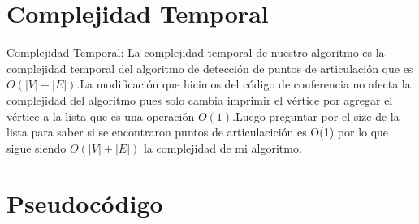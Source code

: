 \documentclass{article}
\begin{document}
    \section{Complejidad Temporal} 
    Complejidad Temporal:\newline
    La complejidad temporal de nuestro algoritmo es la complejidad temporal del algoritmo de detecci\'on de puntos 
    de articulaci\'on que es $O(|V|+|E|)$.La modificaci\'on que hicimos del c\'odigo de conferencia no afecta la 
    complejidad del algoritmo pues solo cambia imprimir el v\'ertice por agregar el v\'ertice a la lista que es una
    operaci\'on $O(1)$.Luego preguntar por el size de la lista para saber si se encontraron puntos de articulacici\'on 
    es O(1) por lo que sigue siendo $O(|V|+|E|)$ la complejidad de mi algoritmo.
    \newline
    
    \section{Pseudoc\'odigo}
    
\end{document}
